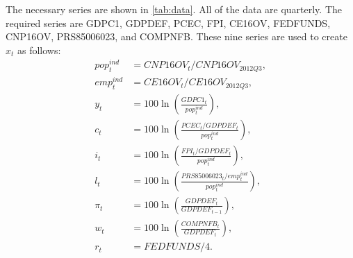 \documentclass[11pt]{article}
\begin{document}
The necessary series are shown in \autoref{tab:data}. All of the data
are quarterly. The required series are GDPC1, GDPDEF, PCEC, FPI, CE16OV,
FEDFUNDS, CNP16OV, PRS85006023, and COMPNFB. These nine series are used
to create \(x_t\) as follows: \begin{align*}
  pop_t^{ind} &= CNP16OV_t / CNP16OV_{2012Q3},\\
  emp_t^{ind} &= CE16OV_t / CE16OV_{2012Q3},\\
  y_t &= 100\ln\left(\frac{GDPC1_t}{pop_t^{ind}}\right),\\
  c_t &= 100\ln\left(\frac{PCEC_t/GDPDEF_t}{pop_t^{ind}}\right),\\
  i_t &= 100\ln\left(\frac{FPI_t/GDPDEF_t}{pop_t^{ind}}\right),\\
  l_t &=
        100\ln\left(\frac{PRS85006023_t/emp_t^{ind}}{pop_t^{ind}}\right),\\
  \pi_t &= 100\ln\left(\frac{GDPDEF_t}{GDPDEF_{t-1}}\right),\\
  w_t &= 100\ln\left(\frac{COMPNFB_t}{GDPDEF_t}\right),\\
  r_t &= FEDFUNDS/4.
\end{align*}

\begin{table}[h]
  \centering
  \caption{Data series from FRED for estimating the DSGE.}
  \label{tab:data}
\end{table}
\end{document}
